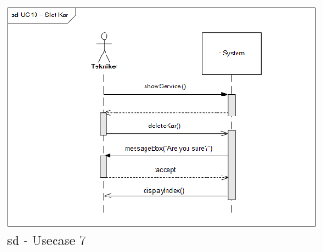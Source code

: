 \begin{figure}[H]
    \centering
    \includegraphics[width=0.8\textwidth]{Systemarkitektur/OverordnedeSekvensdiagrammer/sd_UC10.PNG}
    \caption{sd - Usecase 7}
    \label{fig:sd_UC6}
\end{figure}
